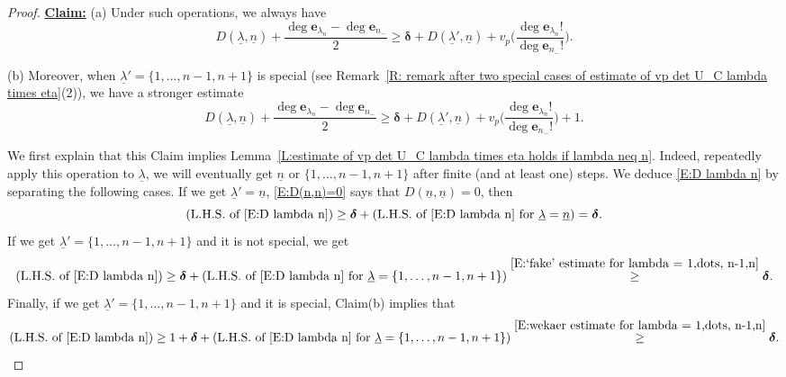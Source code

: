 \documentclass[12pt]{amsart}
\theoremstyle{definition}
\numberwithin{equation}{subsection}
\def\bfe{\mathbf{e}}
\begin{document}
\begin{proof}
\smallskip
\underline{\bf Claim:}
(a) Under such operations, we always have
\begin{equation}
\label{E:comparing D(lambda, n) and D(lambda',n)}
D(\underline \lambda, \underline n) + \frac{\deg \bfe_{\lambda_n} - \deg \bfe_{n_-}}2 \geq \boldsymbol{\delta} + D(\underline \lambda', \underline n) + v_p\Big( \frac{\deg \bfe_{\lambda_n}!}{\deg \bfe_{n_-}!}\Big).
\end{equation}

(b)  Moreover, when $\underline \lambda'=\{1,\dots, n-1,n+1 \}$ is special (see Remark~\ref{R: remark after two special cases of estimate of vp det U_C lambda times eta}(2)), we have a stronger estimate
\begin{equation}
	\label{E:comparing D(lambda, n) and D(lambda',n) in the special case}
	D(\underline \lambda, \underline n) + \frac{\deg \bfe_{\lambda_n} - \deg \bfe_{n_-}}2 \geq \boldsymbol{\delta} + D(\underline \lambda', \underline n) + v_p\Big( \frac{\deg \bfe_{\lambda_n}!}{\deg \bfe_{n_-}!}\Big)+1.
\end{equation}

We first explain that this Claim implies Lemma~\ref{L:estimate of vp det U_C lambda times eta holds if lambda neq n}. Indeed, repeatedly apply this operation to $\underline \lambda$, we will eventually get $\underline n$ or $\{1,\dots, n-1,n+1 \}$ after finite (and at least one) steps. We deduce \eqref{E:D lambda n} by separating the following cases. If we get $\underline \lambda' = \underline n$, \eqref{E:D(n,n)=0} says that $D(\underline n, \underline n) = 0$, then
$$
( \textrm{L.H.S. of \eqref{E:D lambda n}}) \geq \boldsymbol{\delta} + (\textrm{L.H.S. of \eqref{E:D lambda n} for $\underline \lambda= \underline n$}) =  \boldsymbol{\delta}.
$$
If we get $\underline \lambda' = \{1, \dots, n-1, n+1\}$ and it is not special, we get
$$
( \textrm{L.H.S. of \eqref{E:D lambda n}}) \geq \boldsymbol{\delta} + (\textrm{L.H.S. of \eqref{E:D lambda n} for $\underline \lambda = \{1, \dots, n-1,n+1\}$}) \stackrel{\eqref{E:`fake' estimate for lambda = 1,dots, n-1,n}}\geq \boldsymbol{\delta}.
$$
Finally, if we get $\underline \lambda' = \{1, \dots, n-1, n+1\}$ and it is special, Claim(b) implies that
$$
( \textrm{L.H.S. of \eqref{E:D lambda n}}) \geq  1+ \boldsymbol{\delta} + (\textrm{L.H.S. of \eqref{E:D lambda n} for $\underline \lambda = \{1, \dots, n-1,n+1\}$}) \stackrel{\eqref{E:wekaer estimate for lambda = 1,dots, n-1,n}}\geq \boldsymbol{\delta}.
$$

	

\end{proof}
\end{document}
